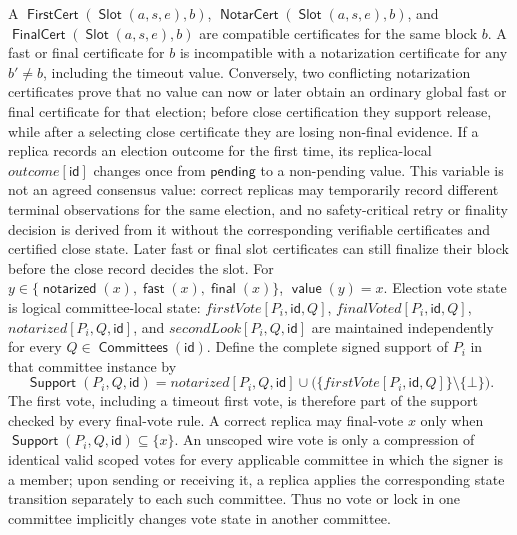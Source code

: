 \documentclass[sigplan,twocolumn,review,anonymous]{acmart}
\newcommand{\func}[1]{\operatorname{\mathsf{#1}}}
\newcommand{\NotarCert}{\func{NotarCert}}
\newcommand{\FirstCert}{\func{FirstCert}}
\newcommand{\FinalCert}{\func{FinalCert}}
\newcommand{\id}{\mathsf{id}}
\newcommand{\Slot}{\func{Slot}}
\newcommand{\valueOf}{\func{value}}
\newcommand{\pending}{\mathsf{pending}}
\newcommand{\notarized}{\func{notarized}}
\newcommand{\fast}{\func{fast}}
\newcommand{\final}{\func{final}}
\newcommand{\Committees}{\func{Committees}}
\begin{document}
A \(\FirstCert(\Slot(a,s,e),b)\), \(\NotarCert(\Slot(a,s,e),b)\), and
\(\FinalCert(\Slot(a,s,e),b)\) are compatible certificates for the same block \(b\).  A fast or final
certificate for \(b\) is incompatible with a notarization certificate for any \(b'\neq b\), including
the timeout value.  Conversely, two conflicting notarization certificates prove that no value can now
or later obtain an ordinary global fast or final certificate for that election; before close
certification they support release, while after a selecting close certificate they are losing
non-final evidence.  If a replica records an election outcome for the first time, its replica-local
\(outcome[\id]\) changes once from \(\pending\) to a non-pending value.  This variable is not an
agreed consensus value: correct replicas may temporarily record different terminal observations for
the same election, and no safety-critical retry or finality decision is derived from it without the
corresponding verifiable certificates and certified close state.  Later fast or final slot certificates
can still finalize their block before the close record decides the slot.  For
\(y\in\{\notarized(x),\fast(x),\final(x)\}\), \(\valueOf(y)=x\).  Election vote state is
logical committee-local state: \(firstVote[P_i,\id,Q]\), \(finalVoted[P_i,\id,Q]\),
\(notarized[P_i,Q,\id]\), and \(secondLook[P_i,Q,\id]\) are maintained independently for every
\(Q\in\Committees(\id)\).  Define the complete signed support of \(P_i\) in that committee instance by
\[
\func{Support}(P_i,Q,\id)=
notarized[P_i,Q,\id]\cup\bigl(\{firstVote[P_i,\id,Q]\}\setminus\{\bot\}\bigr).
\]
The first vote, including a timeout first vote, is therefore part of the support checked by every
final-vote rule.  A correct replica may final-vote \(x\) only when
\(\func{Support}(P_i,Q,\id)\subseteq\{x\}\).  An unscoped wire vote is only a compression of identical valid scoped
votes for every applicable committee in which the signer is a member; upon sending or receiving it,
a replica applies the corresponding state transition separately to each such committee.  Thus no
vote or lock in one committee implicitly changes vote state in another committee.
\end{document}
